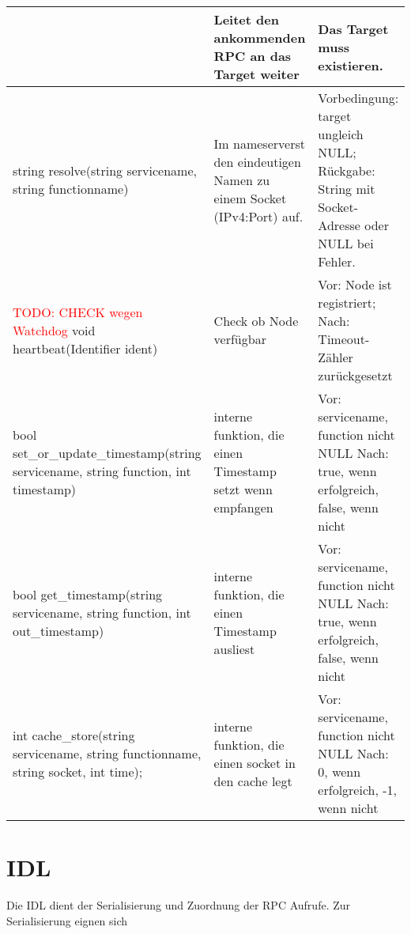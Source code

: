 \begin{longtable}{|>{\raggedright\arraybackslash}p{4cm}|>{\raggedright\arraybackslash}p{5cm}|>{\raggedright\arraybackslash}p{5cm}|}
	& Leitet den ankommenden RPC an das Target weiter
	& Das Target muss existieren.
	\\
	\hline
	string resolve(string servicename, string functionname)
	& Im nameserverst den eindeutigen Namen zu einem Socket (IPv4:Port) auf.
	& Vorbedingung: target ungleich NULL; Rückgabe: String mit Socket-Adresse oder NULL bei Fehler.
	\\
	\hline
	\textcolor{red}{TODO: CHECK wegen Watchdog} void heartbeat(Identifier ident)	
	& Check ob Node verfügbar	
	& Vor: Node ist registriert; Nach: Timeout-Zähler zurückgesetzt
	\\
	\hline
	bool set_or_update_timestamp(string servicename, string function, int timestamp)
	&interne funktion, die einen Timestamp setzt wenn empfangen
	& Vor: servicename, function nicht NULL Nach: true, wenn erfolgreich, false, wenn nicht
	\\
	\hline
	bool get_timestamp(string servicename, string function, int out_timestamp)
	&interne funktion, die einen Timestamp ausliest
	& Vor: servicename, function nicht NULL Nach: true, wenn erfolgreich, false, wenn nicht
	\\
	\hline
	int cache_store(string servicename, string functionname, string socket, int time);
	& interne funktion, die einen socket in den cache legt
	& Vor: servicename, function nicht NULL Nach: 0, wenn erfolgreich, -1, wenn nicht
\end{longtable}






\section{IDL}

Die IDL dient der Serialisierung und Zuordnung der RPC Aufrufe. Zur Serialisierung eignen sich 
